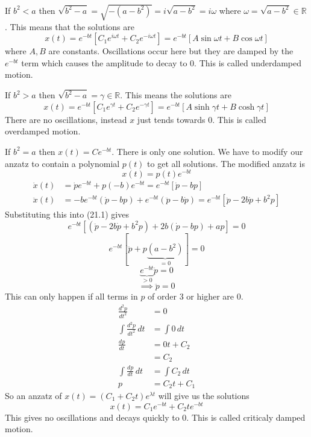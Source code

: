\documentclass{article}
\newcommand{\bb}[1]{\mathbb{#1}}
\newcommand{\dv}[3][]{\frac{d^{#1}{#2}}{d{#3}^{#1}}}
\begin{document}
If \(b^2<a\) then \(\sqrt{b^2-a}=\sqrt{-(a-b^2)}=i\sqrt{a-b^2}=i\omega\) where \(\omega=\sqrt{a-b^2}\in\bb R\). This means that the solutions are
\[x(t)=e^{-bt}[C_1e^{i\omega t}+C_2e^{-i\omega t}]=e^{-bt}[A\sin\omega t+B\cos\omega t]\]
where \(A,B\) are constants. Oscillations occur here but they are damped by the \(e^{-bt}\) term which causes the amplitude to decay to 0. This is called underdamped motion.

If \(b^2>a\) then \(\sqrt{b^2-a}=\gamma\in\bb R\). This means the solutions are
\[x(t)=e^{-bt}[C_1e^{\gamma t}+C_2e^{-\gamma t}]=e^{-bt}[A\sinh\gamma t+B\cosh\gamma t]\]
There are no oscillations, instead \(x\) just tends towards 0. This is called overdamped motion.

If \(b^2=a\) then \(x(t)=Ce^{-bt}\). There is only one solution. We have to modify our anzatz to contain a polynomial \(p(t)\) to get all solutions. The modified anzatz is
\[x(t)=p(t)e^{-bt}\]
\begin{align*}
\dot x(t)&=\dot pe^{-bt}+p(-b)e^{-bt}=e^{-bt}[\dot p-bp]\\
\ddot x(t)&=-be^{-bt}(\dot p-bp)+e^{-bt}(\ddot p-b\dot p)=e^{-bt}[\ddot p-2b\dot p+b^2p]
\end{align*}
Substituting this into (21.1) gives
\[e^{-bt}[(\ddot p-2b\dot p+b^2p)+2b(\dot p-bp)+ap]=0\]
\[e^{-bt}[\ddot p+p\underbrace{(a-b^2)}_{=0}]=0\]
\[\underbrace{e^{-bt}}_{>0}\ddot p=0\]
\[\implies \ddot p=0\]
This can only happen if all terms in \(p\) of order \(3\) or higher are 0.
\begin{align*}
\dv[2]pt&=0\\
\int\dv[2]pt\,dt&=\int 0\, dt\\
\dv pt&=0t+C_2\\
&=C_2\\
\int \dv pt\,dt&=\int C_2\,dt\\
p&=C_2t+C_1
\end{align*}
So an anzatz of \(x(t)=(C_1+C_2t)e^{\lambda t}\) will give us the solutions
\[x(t)=C_1e^{-bt}+C_2te^{-bt}\]
This gives no oscillations and decays quickly to 0. This is called criticaly damped motion.
\end{document}
